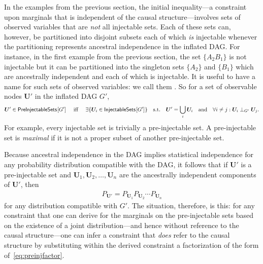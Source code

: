 {In the examples from the previous section, the initial inequality---a constraint upon marginals that is independent of the causal structure---involves sets of observed variables that are \emph{not} all injectable sets.  Each of these sets can, however, be partitioned into disjoint subsets each of which {\em is} injectable whenever the partitioning represents ancestral independence in the inflated DAG.   For instance, in the first example from the previous section, the set $\{ A_2 B_1\}$ is not injectable but it can be partitioned into the singleton sets $\{ A_2 \}$ and $\{ B_1\}$ which are ancestrally independent and each of which is injectable.  It is useful to have a name for such sets of observed variables: we call them . So for a set of observable nodes $\bm{U}'$ in the inflated DAG $G'$,
\begin{align}\label{eq:defpreinj}
\bm{U}'\in{\operatorname{\mathsf{PreInjectableSets}}_{}}\lbrack G'\rbrack \quad\text{ iff }\quad  \exists \{ \bm{U}_i \in {\operatorname{\mathsf{InjectableSets}}_{}}\lbrack G'\rbrack \} \quad \text{s.t.}\quad \bm{U}'=\bigcup_i \bm{U}_i  \quad\text{and} \quad  \forall i\ne j: \bm{U}_i \perp_{G'} \bm{U}_j.
\end{align}
For example, every injectable set is trivially a pre-injectable set.  A pre-injectable set is \emph{maximal} if it is not a proper subset of another pre-injectable set.

Because ancestral independence in the DAG implies statistical independence for any probability distribution compatible with the DAG, it follows that  if 
$\bm{U}'$ is a pre-injectable set and $\bm{U}_1,\bm{U}_2,\ldots,\bm{U}_n$ are the ancestrally independent components of $\bm{U}'$, then 
\begin{align}\label{eq:preinjfactor}
P_{\bm{U}'} = P_{\bm{U}_1} P_{\bm{U}_2} \cdots P_{\bm{U}_n}
\end{align}
for any distribution compatible with $G'$. The situation, therefore, is this: for any constraint that one can derive for the marginals on the pre-injectable sets based on the existence of a joint distribution---and hence without reference to the causal structure---one can infer a constraint that {\em does} refer to the causal structure by substituting within the derived constraint a factorization of the form of~\cref{eq:preinjfactor}.  

}
